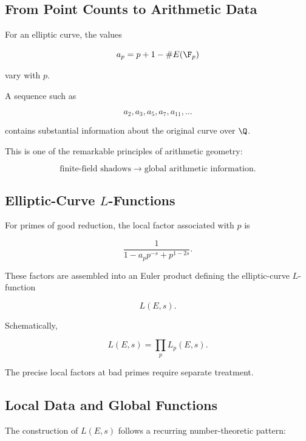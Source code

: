 \subsection{From Point Counts to Arithmetic Data}
\label{subsec:point-counts-arithmetic-data}

For an elliptic curve, the values

\[ a_p=p+1-\#E(\F_p) \]

vary with \(p\).

A sequence such as

\[ a_2,a_3,a_5,a_7,a_{11},\ldots \]

contains substantial information about the original curve over \(\Q\).

This is one of the remarkable principles of arithmetic geometry:

\[
\boxed{
\text{finite-field shadows}
\longrightarrow
\text{global arithmetic information}.
}
\]

\subsection{Elliptic-Curve \(L\)-Functions}
\label{subsec:elliptic-l-function-arithmetic-geometry}

For primes of good reduction, the local factor associated with \(p\) is

\[ \frac{1}{1-a_pp^{-s}+p^{1-2s}}. \]

These factors are assembled into an Euler product defining the elliptic-curve
\(L\)-function

\[ L(E,s). \]

Schematically,

\[ \boxed{L(E,s)=\prod_p L_p(E,s).} \]

The precise local factors at bad primes require separate treatment.

\subsection{Local Data and Global Functions}
\label{subsec:local-data-global-functions}

The construction of \(L(E,s)\) follows a recurring number-theoretic pattern:


